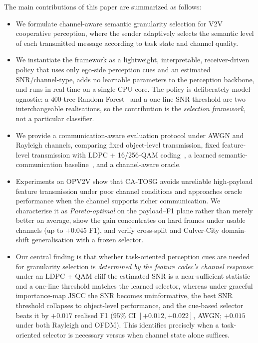 \documentclass[journal]{IEEEtran}
\newcommand{\method}{CA-TOSG}
\begin{document}
The main contributions of this paper are summarized as follows:
\begin{itemize}
    \item We formulate channel-aware semantic granularity selection for V2V cooperative perception, where the sender adaptively selects the semantic level of each transmitted message according to task state and channel quality.
    \item We instantiate the framework as a lightweight, interpretable, receiver-driven policy that uses only ego-side perception cues and an estimated SNR/channel-type, adds no learnable parameters to the perception backbone, and runs in real time on a single CPU core. The policy is deliberately model-agnostic: a $400$-tree Random Forest~\cite{breiman2001random} and a one-line SNR threshold are two interchangeable realisations, so the contribution is the \emph{selection framework}, not a particular classifier.
    \item We provide a communication-aware evaluation protocol under AWGN and Rayleigh channels, comparing fixed object-level transmission, fixed feature-level transmission with LDPC + 16/256-QAM coding~\cite{ieee80211bd}, a learned semantic-communication baseline~\cite{sheng2024importance}, and a channel-aware oracle.
    \item Experiments on OPV2V show that \method{} avoids unreliable high-payload feature transmission under poor channel conditions and approaches oracle performance when the channel supports richer communication. We characterise it as \emph{Pareto-optimal} on the payload--F1 plane rather than merely better on average, show the gain concentrates on hard frames under usable channels (up to $+0.045$ F1), and verify cross-split and Culver-City domain-shift generalisation with a frozen selector.
    \item Our central finding is that whether task-oriented perception cues are needed for granularity selection is \emph{determined by the feature codec's channel response}: under an LDPC + QAM cliff the estimated SNR is a near-sufficient statistic and a one-line threshold matches the learned selector, whereas under graceful importance-map JSCC the SNR becomes uninformative, the best SNR threshold collapses to object-level performance, and the cue-based selector beats it by $+0.017$ realised F1 ($95\%$ CI $[+0.012,+0.022]$, AWGN; $+0.015$ under both Rayleigh and OFDM). This identifies precisely when a task-oriented selector is necessary versus when channel state alone suffices.
\end{itemize}
\end{document}
